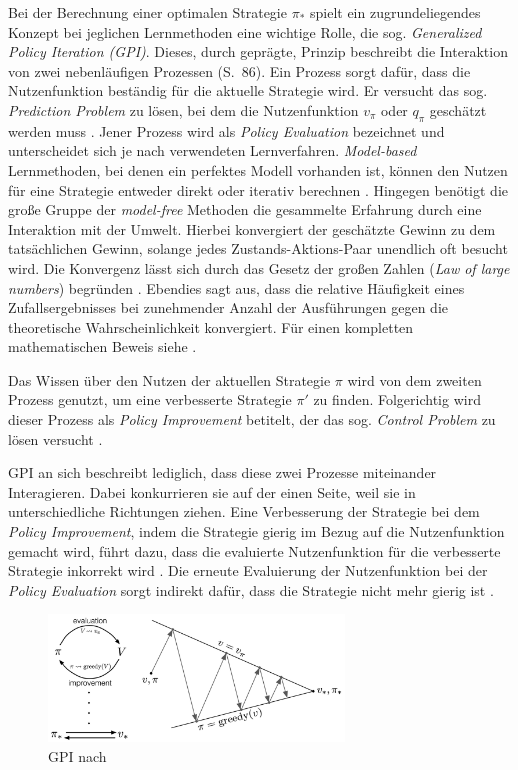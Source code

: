 Bei der Berechnung einer optimalen Strategie $\pi_*$ spielt ein zugrundeliegendes Konzept  bei jeglichen Lernmethoden eine wichtige Rolle, die sog. \textit{Generalized Policy Iteration (GPI)}. Dieses, durch \cite{Sutton1998} geprägte, Prinzip beschreibt die Interaktion von zwei nebenläufigen Prozessen (S.~86). Ein Prozess sorgt dafür, dass die Nutzenfunktion beständig für die aktuelle Strategie wird. Er versucht das sog. \textit{Prediction Problem} zu lösen, bei dem die Nutzenfunktion $v_{\pi}$ oder $q_{\pi}$ geschätzt werden muss \cite[S.~18]{Wiering}. Jener Prozess wird als \textit{Policy Evaluation} bezeichnet und unterscheidet sich je nach verwendeten Lernverfahren. \textit{Model-based} Lernmethoden, bei denen ein perfektes Modell vorhanden ist, können den Nutzen für eine Strategie entweder direkt oder iterativ berechnen \cite[S.~18]{Wiering}. Hingegen benötigt die große Gruppe der \textit{model-free} Methoden die gesammelte Erfahrung durch eine Interaktion mit der Umwelt. Hierbei konvergiert der geschätzte Gewinn zu dem tatsächlichen Gewinn, solange jedes Zustands-Aktions-Paar unendlich oft besucht wird. Die Konvergenz lässt sich durch das \glqq Gesetz der großen Zahlen\grqq{} (\textit{Law of large numbers}) begründen \cite[S.~94]{Sutton1998}.
Ebendies sagt aus, dass die relative Häufigkeit eines Zufallsergebnisses bei zunehmender Anzahl der Ausführungen gegen die theoretische Wahrscheinlichkeit konvergiert. Für einen kompletten mathematischen Beweis siehe \cite[S.~181-189]{dekking2006modern}.
\par 
Das Wissen über den Nutzen der aktuellen Strategie $\pi$ wird von dem zweiten Prozess genutzt, um eine verbesserte Strategie $\pi'$ zu finden. Folgerichtig wird dieser Prozess als \textit{Policy Improvement} betitelt, der das sog. \textit{Control Problem} zu lösen versucht \cite[S.~18]{Wiering}.
\par 
GPI an sich beschreibt lediglich, dass diese zwei Prozesse miteinander Interagieren. Dabei konkurrieren sie auf der einen Seite, weil sie in unterschiedliche Richtungen ziehen. Eine Verbesserung der Strategie bei dem \textit{Policy Improvement}, indem die Strategie gierig im Bezug auf die Nutzenfunktion gemacht wird, führt dazu, dass die evaluierte Nutzenfunktion für die verbesserte Strategie inkorrekt wird \cite[S.~86]{Sutton1998}. Die erneute Evaluierung der Nutzenfunktion bei der \textit{Policy Evaluation} sorgt indirekt dafür, dass die Strategie nicht mehr gierig ist \cite[S.~86]{Sutton1998}.
\par 
\begin{figure}[H]
    \centering
    \includegraphics[width=0.7\textwidth]{images/gpi.jpg}
    \caption{GPI nach \cite[S.~86f]{Sutton1998}}
    \label{fig:GPI}
\end{figure}

